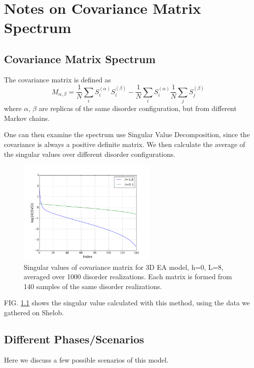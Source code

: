\chapter{Notes on Covariance Matrix Spectrum}
\section{Covariance Matrix Spectrum}
The covariance matrix is defined as 
\[
M_{\alpha,\beta}=\frac{1}{N}\sum_iS_i^{(\alpha)}S_i^{(\beta)}-
\frac{1}{N}\sum_iS_i^{(\alpha)}\frac{1}{N}\sum_jS_j^{(\beta)}
\]
where $\alpha$, $\beta$ are replicas of the same disorder configuration, 
but from different Markov chains.

One can then examine the spectrum use Singular Value Decomposition, since
the covariance is always a positive definite matrix. 
We then calculate the average of the singular values over different disorder 
configurations. 

\begin{figure}[ht]
  \centering
  \includegraphics[width=0.6\textwidth]{img/matrix/svd_data.png}
  \caption{Singular values of covariance matrix for 3D EA model, h=0, L=8, 
averaged over 1000 disorder realizations. 
Each matrix is formed from 140 samples of the same disorder realizations.}
  \label{fig:exp}
\end{figure}

FIG. \ref{fig:exp} shows the singular value calculated with this method, using
the data we gathered on Shelob.

\section{Different Phases/Scenarios}
Here we discuss a few possible scenarios of this model.


